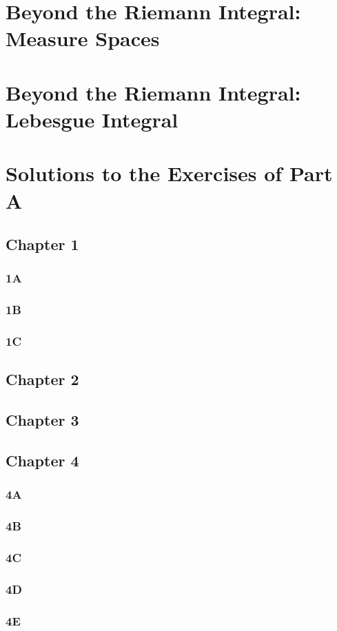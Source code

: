 \chapter{Beyond the Riemann Integral: Measure Spaces}
\chapter{Beyond the Riemann Integral: Lebesgue Integral}
\chapter{Solutions to the Exercises of Part A}
\section*{Chapter 1}
\subsection*{1A}
\subsection*{1B}
\subsection*{1C}
\section*{Chapter 2}
\section*{Chapter 3}
\section*{Chapter 4}
\subsection*{4A}
\subsection*{4B}
\subsection*{4C}
\subsection*{4D}
\subsection*{4E}